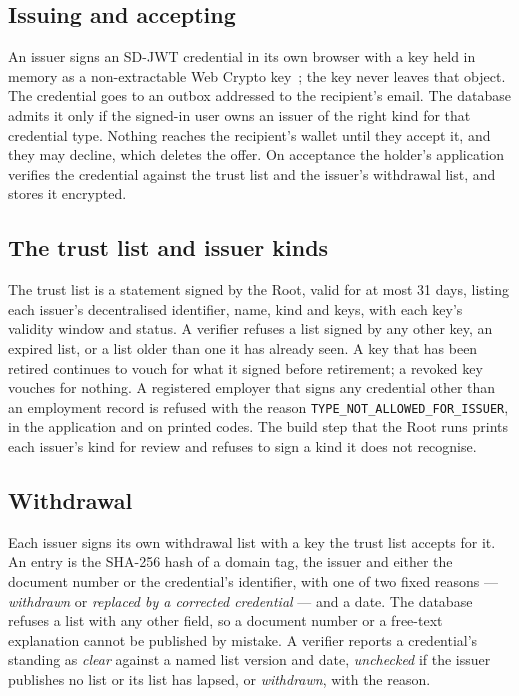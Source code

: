 \documentclass[10pt,a4paper,twocolumn]{article}
\newcommand{\code}[1]{\texttt{\small #1}}
\begin{document}
\subsection{Issuing and accepting}

An issuer signs an SD-JWT credential in its own browser with a key held in memory
as a non-extractable Web Crypto key~\citep{webcrypto}; the key never leaves that
object. The credential goes to an outbox addressed to the recipient's email. The
database admits it only if the signed-in user owns an issuer of the right kind
for that credential type. Nothing reaches the recipient's wallet until they
accept it, and they may decline, which deletes the offer. On acceptance the
holder's application verifies the credential against the trust list and the
issuer's withdrawal list, and stores it encrypted.

\subsection{The trust list and issuer kinds}

The trust list is a statement signed by the Root, valid for at most 31 days,
listing each issuer's decentralised identifier, name, kind and keys, with each
key's validity window and status. A verifier refuses a list signed by any other
key, an expired list, or a list older than one it has already seen. A key that
has been retired continues to vouch for what it signed before retirement; a
revoked key vouches for nothing. A registered employer that signs any credential
other than an employment record is refused with the reason
\code{TYPE\_NOT\_ALLOWED\_FOR\_ISSUER}, in the application and on printed codes.
The build step that the Root runs prints each issuer's kind for review and
refuses to sign a kind it does not recognise.

\subsection{Withdrawal}

Each issuer signs its own withdrawal list with a key the trust list accepts for
it. An entry is the SHA-256 hash of a domain tag, the issuer and either the
document number or the credential's identifier, with one of two fixed reasons
--- \emph{withdrawn} or \emph{replaced by a corrected credential} --- and a date.
The database refuses a list with any other field, so a document number or a
free-text explanation cannot be published by mistake. A verifier reports a
credential's standing as \emph{clear} against a named list version and date,
\emph{unchecked} if the issuer publishes no list or its list has lapsed, or
\emph{withdrawn}, with the reason.
\end{document}
